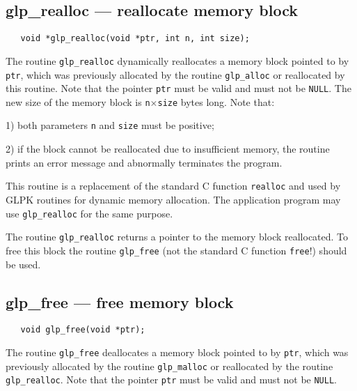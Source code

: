 \subsection{glp\_realloc --- reallocate memory block}

\synopsis

\begin{verbatim}
   void *glp_realloc(void *ptr, int n, int size);
\end{verbatim}

\description

The routine \verb|glp_realloc| dynamically reallocates a memory block
pointed to by \verb|ptr|, which was previously allocated by the routine
\verb|glp_alloc| or reallocated by this routine. Note that the pointer
\verb|ptr| must be valid and must not be \verb|NULL|. The new size of
the memory block is \verb|n|$\times$\verb|size| bytes long. Note that:

1) both parameters \verb|n| and \verb|size| must be positive;

2) if the block cannot be reallocated due to insufficient memory, the
routine prints an error message and abnormally terminates the program.

This routine is a replacement of the standard C function \verb|realloc|
and used by GLPK routines for dynamic memory allocation. The
application program may use \verb|glp_realloc| for the same purpose.

\returns

The routine \verb|glp_realloc| returns a pointer to the memory block
reallocated. To free this block the routine \verb|glp_free| (not the
standard C function \verb|free|!) should be used.

\subsection{glp\_free --- free memory block}

\synopsis

\begin{verbatim}
   void glp_free(void *ptr);
\end{verbatim}

\description

The routine \verb|glp_free| deallocates a memory block pointed to by
\verb|ptr|, which was previously allocated by the routine
\verb|glp_malloc| or reallocated by the routine \verb|glp_realloc|.
Note that the pointer \verb|ptr| must be valid and must not be
\verb|NULL|.

